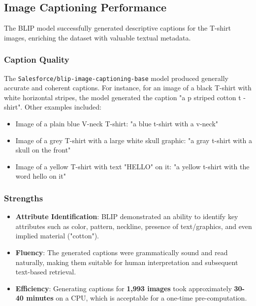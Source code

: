 \documentclass{article}
\begin{document}
\subsection{Image Captioning Performance}
The BLIP model successfully generated descriptive captions for the T-shirt images, enriching the dataset with valuable textual metadata.

\subsubsection{Caption Quality}
The \texttt{Salesforce/blip-image-captioning-base} model produced generally accurate and coherent captions. For instance, for an image of a black T-shirt with white horizontal stripes, the model generated the caption "a p striped cotton t - shirt". Other examples included:
\begin{itemize}
    \item Image of a plain blue V-neck T-shirt: "a blue t-shirt with a v-neck"
    \item Image of a grey T-shirt with a large white skull graphic: "a gray t-shirt with a skull on the front"
    \item Image of a yellow T-shirt with text "HELLO" on it: "a yellow t-shirt with the word hello on it"
\end{itemize}

\subsubsection{Strengths}
\begin{itemize}
    \item \textbf{Attribute Identification}: BLIP demonstrated an ability to identify key attributes such as color, pattern, neckline, presence of text/graphics, and even implied material ("cotton").
    \item \textbf{Fluency}: The generated captions were grammatically sound and read naturally, making them suitable for human interpretation and subsequent text-based retrieval.
    \item \textbf{Efficiency}: Generating captions for \textbf{1,993 images} took approximately \textbf{30-40 minutes} on a CPU, which is acceptable for a one-time pre-computation.
\end{itemize}
\end{document}
